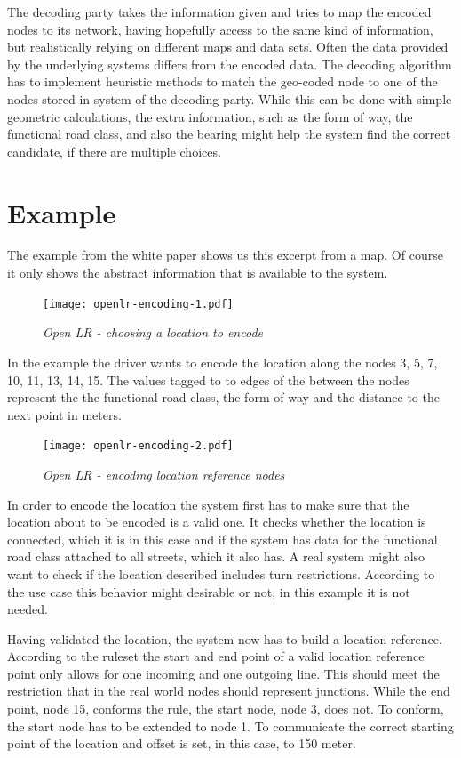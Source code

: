 The decoding party takes the information given and tries to map the encoded nodes to its network, having hopefully access to the same kind of information, but realistically relying on different maps and data sets. Often the data provided by the underlying systems differs from the encoded data. The decoding algorithm has to implement heuristic methods to match the geo-coded node to one of the nodes stored in system of the decoding party. While this can be done with simple geometric calculations, the extra information, such as the form of way, the functional road class, and also the bearing might help the system find the correct candidate, if there are multiple choices.

\section{Example}
\label{sec:open-lr-example}

The example from the white paper shows us this excerpt from a map. Of course it only shows the abstract information that is available to the system.

\begin{figure}
  \texttt{[image: openlr-encoding-1.pdf]}%
  \caption{\emph{Open LR - choosing a location to encode}}%
  \label{fig:openlr-encoding-1}%
\end{figure}

In the example the driver wants to encode the location along the nodes 3, 5, 7, 10, 11, 13, 14, 15. The values tagged to to edges of the between the nodes represent the the functional road class, the form of way and the distance to the next point in meters.

\begin{figure}
  \texttt{[image: openlr-encoding-2.pdf]}%
  \caption{\emph{Open LR - encoding location reference nodes}}%
  \label{fig:openlr-encoding-2}%
\end{figure}

In order to encode the location the system first has to make sure that the location about to be encoded is a valid one. It checks whether the location is connected, which it is in this case and if the system has data for the functional road class attached to all streets, which it also has. A real system might also want to check if the location described includes turn restrictions. According to the use case this behavior might desirable or not, in this example it is not needed.

Having validated the location, the system now has to build a location reference. According to the ruleset the start and end point of a valid location reference point only allows for one incoming and one outgoing line. This should meet the restriction that in the real world nodes should represent junctions. While the end point, node 15, conforms the rule, the start node, node 3, does not. To conform, the start node has to be extended to node 1. To communicate the correct starting point of the location and offset is set, in this case, to 150 meter.

